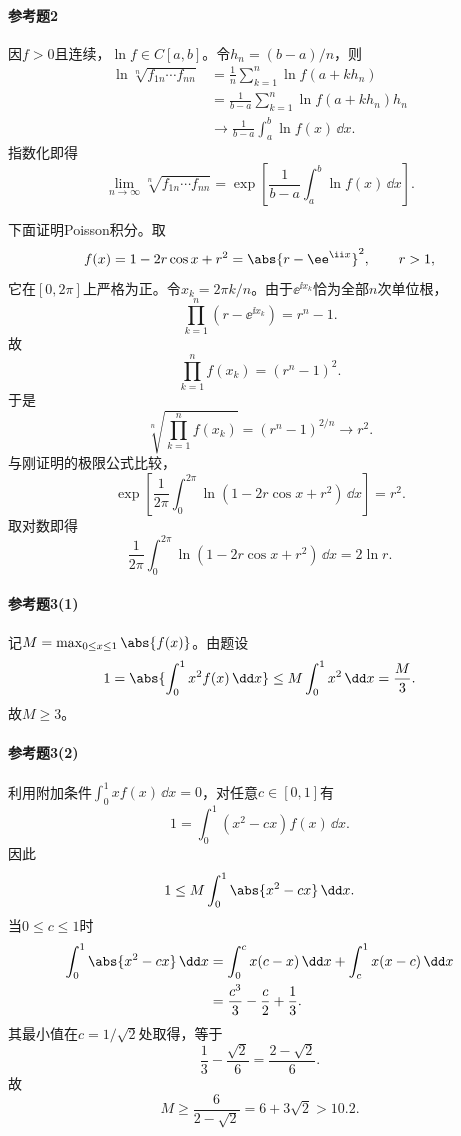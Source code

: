 \paragraph{参考题2}
\begin{xsolution}
因$f>0$且连续，$\ln f\in C[a,b]$。令$h_n=(b-a)/n$，则
\begin{align*}
\ln\sqrt[n]{f_{1n}\cdots f_{nn}}
&=\frac1n\sum_{k=1}^n\ln f(a+kh_n)\\
&=\frac1{b-a}\sum_{k=1}^n\ln f(a+kh_n)h_n\\
&\longrightarrow\frac1{b-a}\int_a^b\ln f(x)\,\dd x.
\end{align*}
指数化即得
\[
 \lim_{n\to\infty}\sqrt[n]{f_{1n}\cdots f_{nn}}
 =\exp\left[\frac1{b-a}\int_a^b\ln f(x)\,\dd x\right].
\]

下面证明Poisson积分。取
\[
 f(x)=1-2r\cos x+r^2=\abs{r-\ee^{\ii x}}^2,
 \qquad r>1,
\]
它在$[0,2\pi]$上严格为正。令$x_k=2\pi k/n$。由于$\ee^{\ii x_k}$恰为全部$n$次单位根，
\[
 \prod_{k=1}^n(r-\ee^{\ii x_k})=r^n-1.
\]
故
\[
 \prod_{k=1}^nf(x_k)=(r^n-1)^2.
\]
于是
\[
 \sqrt[n]{\prod_{k=1}^nf(x_k)}=(r^n-1)^{2/n}\longrightarrow r^2.
\]
与刚证明的极限公式比较，
\[
 \exp\left[\frac1{2\pi}\int_0^{2\pi}
 \ln(1-2r\cos x+r^2)\,\dd x\right]=r^2.
\]
取对数即得
\[
 \boxed{\frac1{2\pi}\int_0^{2\pi}
 \ln(1-2r\cos x+r^2)\,\dd x=2\ln r}.
\]
\end{xsolution}

\paragraph{参考题3(1)}
\begin{xsolution}
记$M=\max_{0\le x\le1}\abs{f(x)}$。由题设
\[
 1=\abs{\int_0^1x^2f(x)\,\dd x}
 \le M\int_0^1x^2\,\dd x=\frac M3.
\]
故$M\ge3$。
\end{xsolution}

\paragraph{参考题3(2)}
\begin{xsolution}
利用附加条件$\int_0^1xf(x)\,\dd x=0$，对任意$c\in[0,1]$有
\[
 1=\int_0^1(x^2-cx)f(x)\,\dd x.
\]
因此
\[
 1\le M\int_0^1\abs{x^2-cx}\,\dd x.
\]
当$0\le c\le1$时
\begin{align*}
\int_0^1\abs{x^2-cx}\,\dd x
&=\int_0^cx(c-x)\,\dd x+\int_c^1x(x-c)\,\dd x\\
&=\frac{c^3}{3}-\frac c2+\frac13.
\end{align*}
其最小值在$c=1/\sqrt2$处取得，等于
\[
 \frac13-\frac{\sqrt2}{6}=\frac{2-\sqrt2}{6}.
\]
故
\[
 M\ge\frac6{2-\sqrt2}=6+3\sqrt2>10.2.
\]
\end{xsolution}

